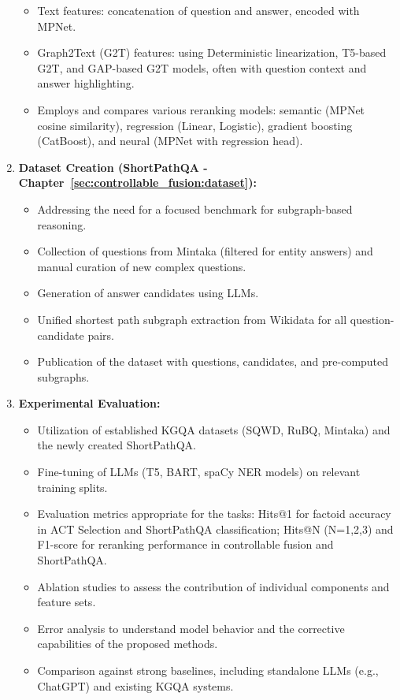 \begin{enumerate}
\begin{itemize}
                \item Text features: concatenation of question and answer, encoded with MPNet.
                \item Graph2Text (G2T) features: using Deterministic linearization, T5-based G2T, and GAP-based G2T models, often with question context and answer highlighting.
            \item Employs and compares various reranking models: semantic (MPNet cosine similarity), regression (Linear, Logistic), gradient boosting (CatBoost), and neural (MPNet with regression head).
    \end{itemize}
    \item \textbf{Dataset Creation (ShortPathQA - Chapter~\ref{sec:controllable_fusion:dataset}):}
    \begin{itemize}
        \item Addressing the need for a focused benchmark for subgraph-based reasoning.
        \item Collection of questions from Mintaka (filtered for entity answers) and manual curation of new complex questions.
        \item Generation of answer candidates using LLMs.
        \item Unified shortest path subgraph extraction from Wikidata for all question-candidate pairs.
        \item Publication of the dataset with questions, candidates, and pre-computed subgraphs.
    \end{itemize}
    \item \textbf{Experimental Evaluation:}
    \begin{itemize}
        \item Utilization of established KGQA datasets (SQWD, RuBQ, Mintaka) and the newly created ShortPathQA.
        \item Fine-tuning of LLMs (T5, BART, spaCy NER models) on relevant training splits.
        \item Evaluation metrics appropriate for the tasks: Hits@1 for factoid accuracy in ACT Selection and ShortPathQA classification; Hits@N (N=1,2,3) and F1-score for reranking performance in controllable fusion and ShortPathQA.
        \item Ablation studies to assess the contribution of individual components and feature sets.
        \item Error analysis to understand model behavior and the corrective capabilities of the proposed methods.
        \item Comparison against strong baselines, including standalone LLMs (e.g., ChatGPT) and existing KGQA systems.

\end{itemize}
\end{enumerate}
